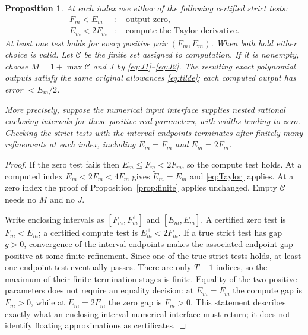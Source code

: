 \documentclass[11pt]{article}
\newtheorem{proposition}[theorem]{Proposition}
\begin{document}
\begin{proposition}\label{prop:overlap}
At each index use either of the following certified strict tests:
\begin{align}
F_m<E_m&:\quad\text{output zero},\label{eq:zerotest}\\
E_m<2F_m&:\quad\text{compute the Taylor derivative}.
\label{eq:computetest}
\end{align}
At least one test holds for every positive pair $(F_m,E_m)$.
When both hold either choice is valid. Let $\mathcal C$ be
the finite set assigned to computation. If it is nonempty,
choose $M=1+\max\mathcal C$ and $J$ by
\eqref{eq:J1}--\eqref{eq:J2}. The resulting exact polynomial
outputs satisfy the same original allowances
\eqref{eq:tilde}; each computed output has error $<E_m/2$.

More precisely, suppose the numerical input interface supplies
nested rational enclosing intervals for these positive real
parameters, with widths tending to zero. Checking the strict
tests with the interval endpoints terminates after finitely
many refinements at each index, including $E_m=F_m$ and
$E_m=2F_m$.
\end{proposition}
\begin{proof}
If the zero test fails then $E_m\le F_m<2F_m$, so the compute
test holds. At a computed index $E_m<2F_m<4F_m$ gives
$\widetilde E_m=E_m$ and \eqref{eq:Taylor} applies.
At a zero index the proof of Proposition~\ref{prop:finite}
applies unchanged. Empty $\mathcal C$ needs no $M$ and no $J$.

Write enclosing intervals as $[F_m^-,F_m^+]$ and
$[E_m^-,E_m^+]$. A certified zero test is $F_m^+<E_m^-$;
a certified compute test is $E_m^+<2F_m^-$. If a true
strict test has gap $g>0$, convergence of the interval
endpoints makes the associated endpoint gap positive at
some finite refinement. Since one of the true strict
tests holds, at least one endpoint test eventually passes.
There are only $T+1$ indices, so the maximum of their finite
termination stages is finite. Equality of the two positive
parameters does not require an equality decision: at
$E_m=F_m$ the compute gap is $F_m>0$, while at $E_m=2F_m$
the zero gap is $F_m>0$. This statement describes exactly
what an enclosing-interval numerical interface must return;
it does not identify floating approximations as certificates.
\end{proof}
\end{document}
